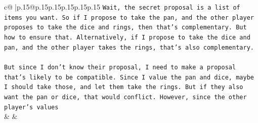 \documentclass{article}
\begin{document}
{\begin{supertabular}{c@{$\;$}|p{.15\linewidth}@{}p{.15\linewidth}p{.15\linewidth}p{.15\linewidth}p{.15\linewidth}p{.15\linewidth}}
{{{\texttt{Wait, the secret proposal is a list of items you want. So if I propose to take the pan, and the other player proposes to take the dice and rings, then that's complementary. But how to ensure that. Alternatively, if I propose to take the dice and pan, and the other player takes the rings, that's also complementary.} \\
\\ 
\texttt{But since I don't know their proposal, I need to make a proposal that's likely to be compatible. Since I value the pan and dice, maybe I should take those, and let them take the rings. But if they also want the pan or dice, that would conflict. However, since the other player's values} \\
            }
        }
    }
    & & \\ \\


\end{supertabular}}
\end{document}
